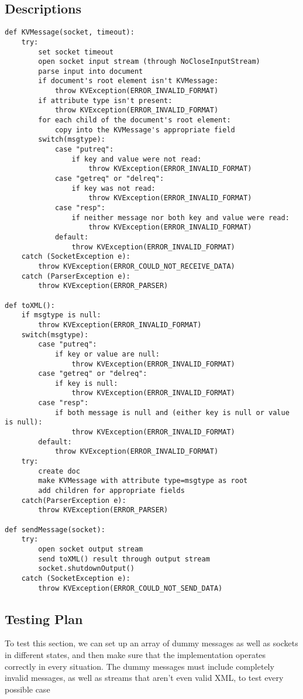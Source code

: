 \subsection{Descriptions}
\begin{verbatim}
def KVMessage(socket, timeout):
    try:
        set socket timeout
        open socket input stream (through NoCloseInputStream)
        parse input into document
        if document's root element isn't KVMessage:
            throw KVException(ERROR_INVALID_FORMAT)
        if attribute type isn't present:
            throw KVException(ERROR_INVALID_FORMAT)
        for each child of the document's root element:
            copy into the KVMessage's appropriate field
        switch(msgtype):
            case "putreq":
                if key and value were not read:
                    throw KVException(ERROR_INVALID_FORMAT)
            case "getreq" or "delreq":
                if key was not read:
                    throw KVException(ERROR_INVALID_FORMAT)
            case "resp":
                if neither message nor both key and value were read:
                    throw KVException(ERROR_INVALID_FORMAT)
            default:
                throw KVException(ERROR_INVALID_FORMAT)
    catch (SocketException e):
        throw KVException(ERROR_COULD_NOT_RECEIVE_DATA)
    catch (ParserException e):
        throw KVException(ERROR_PARSER)

def toXML():
    if msgtype is null:
        throw KVException(ERROR_INVALID_FORMAT)
    switch(msgtype):
        case "putreq":
            if key or value are null:
                throw KVException(ERROR_INVALID_FORMAT)
        case "getreq" or "delreq":
            if key is null:
                throw KVException(ERROR_INVALID_FORMAT)
        case "resp":
            if both message is null and (either key is null or value is null):
                throw KVException(ERROR_INVALID_FORMAT)
        default:
            throw KVException(ERROR_INVALID_FORMAT)
    try:
        create doc
        make KVMessage with attribute type=msgtype as root
        add children for appropriate fields
    catch(ParserException e):
        throw KVException(ERROR_PARSER)

def sendMessage(socket):
    try:
        open socket output stream
        send toXML() result through output stream
        socket.shutdownOutput()
    catch (SocketException e):
        throw KVException(ERROR_COULD_NOT_SEND_DATA)
\end{verbatim}
\subsection{Testing Plan}
To test this section, we can set up an array of dummy messages as well as sockets in different states, and then make sure that the implementation operates correctly in every situation. The dummy messages must include completely invalid messages, as well as streams that aren't even valid XML, to test every possible case
